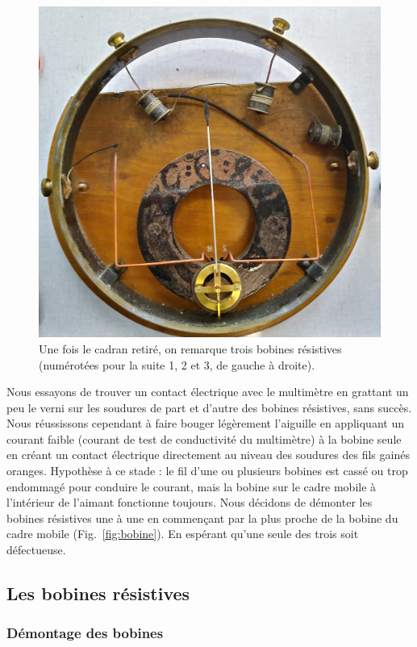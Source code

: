 \documentclass[12pt,a4paper,fleqn]{article}
\begin{document}
\begin{figure}[htbp]
    \center
    \includegraphics[height=300 pt]{images/20210205_155230_HDR.jpg}
    \caption{Une fois le cadran retiré, on remarque trois bobines résistives (numérotées pour la suite 1, 2 et 3, de gauche à droite).}
    \label{fig:galva_volt_bob}    
\end{figure}

Nous essayons de trouver un contact électrique avec le multimètre en grattant un peu le verni sur les soudures de part et d'autre des bobines résistives, sans succès.
Nous réussissons cependant à faire bouger légèrement l'aiguille en appliquant un courant faible (courant de test de conductivité du multimètre) à la bobine seule en créant un contact électrique directement au niveau des soudures des fils gainés oranges.
Hypothèse à ce stade : le fil d'une ou plusieurs bobines est cassé ou trop endommagé pour conduire le courant, mais la bobine sur le cadre mobile à l'intérieur de l'aimant fonctionne toujours.
Nous décidons de démonter les bobines résistives une à une en commençant par la plus proche de la bobine du cadre mobile (Fig.~\ref{fig:bobine}).
En espérant qu'une seule des trois soit défectueuse.

\subsection{Les bobines résistives}

\subsubsection{Démontage des bobines}
\end{document}
